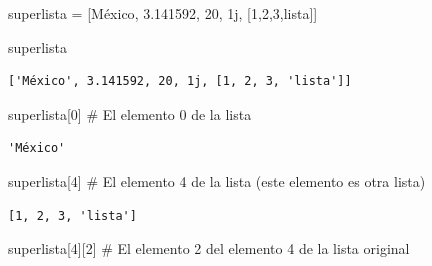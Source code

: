 \documentclass[
  spanish,
  letterpaper,
]{scrbook}
\newenvironment{Shaded}{\begin{snugshade}}{\end{snugshade}}
\newcommand{\CommentTok}[1]{\textcolor[rgb]{0.37,0.37,0.37}{#1}}
\newcommand{\DecValTok}[1]{\textcolor[rgb]{0.68,0.00,0.00}{#1}}
\newcommand{\FloatTok}[1]{\textcolor[rgb]{0.68,0.00,0.00}{#1}}
\newcommand{\NormalTok}[1]{\textcolor[rgb]{0.00,0.23,0.31}{#1}}
\newcommand{\OperatorTok}[1]{\textcolor[rgb]{0.37,0.37,0.37}{#1}}
\newcommand{\OtherTok}[1]{\textcolor[rgb]{0.00,0.23,0.31}{#1}}
\newcommand{\StringTok}[1]{\textcolor[rgb]{0.13,0.47,0.30}{#1}}
\theoremstyle{definition}
\theoremstyle{remark}
\begin{document}
\begin{Shaded}
\begin{Highlighting}[]
\NormalTok{superlista }\OperatorTok{=}\NormalTok{ [}\StringTok{\textquotesingle{}México\textquotesingle{}}\NormalTok{, }\FloatTok{3.141592}\NormalTok{, }\DecValTok{20}\NormalTok{, }\OtherTok{1j}\NormalTok{, [}\DecValTok{1}\NormalTok{,}\DecValTok{2}\NormalTok{,}\DecValTok{3}\NormalTok{,}\StringTok{\textquotesingle{}lista\textquotesingle{}}\NormalTok{]]}
\end{Highlighting}
\end{Shaded}

\begin{Shaded}
\begin{Highlighting}[]
\NormalTok{superlista}
\end{Highlighting}
\end{Shaded}

\begin{verbatim}
['México', 3.141592, 20, 1j, [1, 2, 3, 'lista']]
\end{verbatim}

\begin{Shaded}
\begin{Highlighting}[]
\NormalTok{superlista[}\DecValTok{0}\NormalTok{] }\CommentTok{\# El elemento 0 de la lista}
\end{Highlighting}
\end{Shaded}

\begin{verbatim}
'México'
\end{verbatim}

\begin{Shaded}
\begin{Highlighting}[]
\NormalTok{superlista[}\DecValTok{4}\NormalTok{] }\CommentTok{\# El elemento 4 de la lista (este elemento es otra lista)}
\end{Highlighting}
\end{Shaded}

\begin{verbatim}
[1, 2, 3, 'lista']
\end{verbatim}

\begin{Shaded}
\begin{Highlighting}[]
\NormalTok{superlista[}\DecValTok{4}\NormalTok{][}\DecValTok{2}\NormalTok{] }\CommentTok{\# El elemento 2 del elemento 4 de la lista original}
\end{Highlighting}
\end{Shaded}
\end{document}
